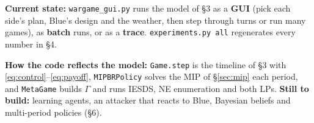
\textbf{Current state:} \texttt{wargame\_gui.py} runs the model of \S3 as a \textbf{GUI} (pick each side's plan,
Blue's design and the weather, then step through turns or run many games), as \textbf{batch} runs, or as a \textbf{trace}. \texttt{experiments.py all} regenerates
every number in \S4.

\textbf{How the code reflects the model:} \texttt{Game.step} is the timeline of \S3 with
\eqref{eq:control}--\eqref{eq:payoff}, \texttt{MIPBRPolicy} solves the MIP of \S\ref{sec:mip} each period, and
\texttt{MetaGame} builds $\Gamma$ and runs IESDS, NE enumeration and both LPs. \textbf{Still to build:} learning agents, an attacker that reacts to Blue, Bayesian beliefs and multi-period
policies (\S6).
